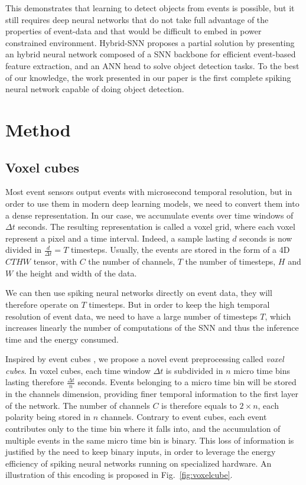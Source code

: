 \documentclass[conference]{IEEEtran}
\begin{document}
This demonstrates that learning to detect objects from events is possible, but it still requires deep neural networks that do not take full advantage of the properties of event-data and that would be difficult to embed in power constrained environment. Hybrid-SNN \cite{hybridsnn} proposes a partial solution by presenting an hybrid neural network composed of a SNN backbone for efficient event-based feature extraction, and an ANN head to solve object detection tasks. To the best of our knowledge, the work presented in our paper is the first complete spiking neural network capable of doing object detection.

\section{Method}

\subsection{Voxel cubes}

Most event sensors output events with  microsecond temporal resolution, but in order to use them in modern deep learning models, we need to convert them into a dense representation. In our case, we accumulate events over time windows of $\Delta t$ seconds. The resulting representation is called a voxel grid, where each voxel represent a pixel and a time interval. Indeed, a sample lasting $d$ seconds is now divided in $\frac{d}{\Delta t} = T$ timesteps. Usually, the events are stored in the form of a 4D $CTHW$ tensor, with $C$ the number of channels, $T$ the number of timesteps, $H$ and $W$ the height and width of the data. 

We can then use spiking neural networks directly on event data, they will therefore operate on $T$ timesteps. But in order to keep the high temporal resolution of event data, we need to have a large number of timesteps $T$, which increases linearly the number of computations of the SNN and thus the inference time and the energy consumed. 

Inspired by event cubes \cite{eventcube}, we propose a novel event preprocessing called \textit{voxel cubes}. In voxel cubes, each time window $\Delta t$ is subdivided in $n$ micro time bins lasting therefore $\frac{\Delta t}{n}$ seconds. Events belonging to a micro time bin will be stored in the channels dimension, providing finer temporal information to the first layer of the network. The number of channels $C$ is therefore equals to $2 \times n$, each polarity being stored in $n$ channels. Contrary to event cubes, each event contributes only to the time bin where it falls into, and the accumulation of multiple events in the same micro time bin is binary. This loss of information is justified by the need to keep binary inputs, in order to leverage the energy efficiency of spiking neural networks running on specialized hardware. An illustration of this encoding is proposed in Fig.~\ref{fig:voxelcube}.
\end{document}
